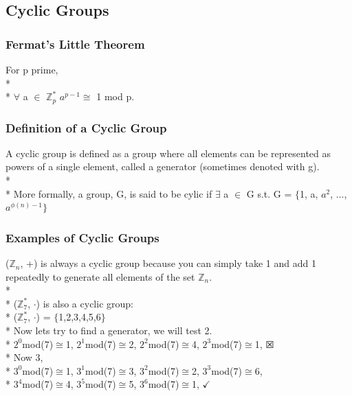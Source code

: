 \documentclass[11pt]{article}
\begin{document}
\subsection{Cyclic Groups}
\subsubsection{Fermat's Little Theorem}
For p prime,\\*\\*
$\forall$ a $\in$ $\mathbb{Z}^*_{p}$ \makebox[0.125in]{}$a^{p-1} \cong$ 1 mod p.

\subsubsection{Definition of a Cyclic Group}
A cyclic group is defined as a group where all elements can be represented as
powers of a single element, called a generator (sometimes denoted with g).\\*\\*
More formally, a group, G, is said to be cylic if $\exists$ a $\in$ G
s.t. G = $\{$1, a, $a^2$, ..., $a^{\phi(n)-1} \}$

\subsubsection{Examples of Cyclic Groups}
($\mathbb{Z}_{n}$, +) is always a cyclic group because you can simply take
1 and add 1 repeatedly to generate all elements of the set
$\mathbb{Z}_{n}$.\\*\\*
($\mathbb{Z}^*_7$, $\cdot$) is also a cyclic group:\\*
($\mathbb{Z}^*_7$, $\cdot$) = $\{$1,2,3,4,5,6$\}$\\*
Now lets try to find a generator, we will test 2.\\*
\indent $2^0$mod(7)$\cong$1, \indent $2^1$mod(7)$\cong$2, \indent
$2^2$mod(7)$\cong$4, \indent $2^3$mod(7)$\cong$1, $\XBox$\\* 
Now 3,\\*
\indent $3^0$mod(7)$\cong$1, \indent $3^1$mod(7)$\cong$3, \indent
$3^2$mod(7)$\cong$2, \indent $3^3$mod(7)$\cong$6,\\*
\indent $3^4$mod(7)$\cong$4,
\indent $3^5$mod(7)$\cong$5, \indent $3^6$mod(7)$\cong$1, $\checkmark$
\end{document}
